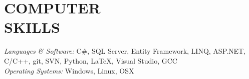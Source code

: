 
\section{COMPUTER \\ SKILLS} {\sl Languages \& Software:} C\#, SQL Server,
	Entity Framework, LINQ, ASP.NET, C/C++, git, SVN, Python, \LaTeX,
	Visual Studio, GCC\\
	{\sl Operating Systems:} Windows, Linux, OSX

